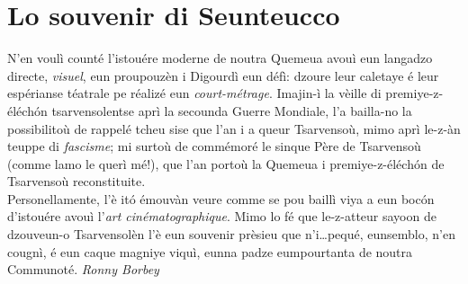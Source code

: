 \section*{Lo souvenir di Seunteucco}
\og N'en voulì counté l'istouére moderne de noutra Quemeua avouì eun langadzo directe, \textit{visuel}, eun proupouzèn i Digourdì eun défì: dzoure leur caletaye é leur espérianse téatrale pe réalizé eun \textit{court-métrage}. Imajin-ì la vèille di premiye-z-éléch\'on tsarvensolentse aprì la secounda Guerre Mondiale, l'a bailla-no la possibilitoù de rappelé tcheu sise que l'an i a queur Tsarvensoù, mimo aprì le-z-àn teuppe di \textit{fascisme}; mi surtoù de commémoré le sinque Père de Tsarvensoù (comme lamo le querì mé!), que l'an portoù la Quemeua i premiye-z-éléch\'on de Tsarvensoù reconstituite.
\\Personellamente, l'è it\'o émouvàn veure comme se pou baillì viya a eun boc\'on d'istouére avouì l'\textit{art cinématographique}. Mimo lo fé que le-z-atteur sayoon de dzouveun-o Tsarvensolèn l'è eun souvenir prèsieu que n'i\ldots pequé, eunsemblo, n'en cougnì, é eun caque magniye viquì, eunna padze eumpourtanta de noutra Communoté.
\fg{}
\newline
\newline
\hspace*{\fill} \textit{Ronny Borbey}

%
